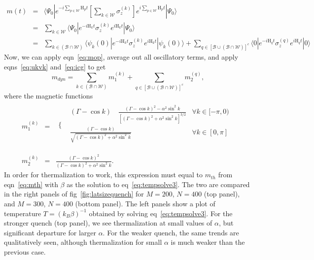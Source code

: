 \documentclass[a4paper,10pt]{article}
\begin{document}
\begin{eqnarray}
{m}(t)   &=&  \langle\Psi_0|e^{-i\sum_{p\in\mathcal{W}}\mathrm{H}_p t}\left[\sum_{k\in\mathcal{W}}\sigma^{(k)}_z\right]e^{i\sum_{p\in\mathcal{W}}\mathrm{H}_p t}|\Psi_0\rangle  \nonumber \\
              &=&  \sum_{k\in\mathcal{W}} \langle\Psi_0|e^{-i\mathrm{H}_k t}\sigma^{(k)}_z e^{i\mathrm{H}_k t}|\Psi_0\rangle \nonumber \\
              &=& \sum_{k\in{\left(\mathcal{B}\cap\mathcal{W}\right)}} \langle\psi_k(0)|e^{-i\mathrm{H}_k t}\sigma^{(k)}_z e^{i\mathrm{H}_k t}|\psi_k(0)\rangle + \sum_{q\in\left[\mathcal{B}\cup\left(\mathcal{B}\cap\mathcal{W}\right)\right]^c } \langle0|e^{-i\mathrm{H}_q t}\sigma^{(q)}_z e^{i\mathrm{H}_q t}|0\rangle
\end{eqnarray}
Now, we can apply eqn~\ref{eq:mop}, average out all oscillatory terms, and apply eqns~\ref{eq:ukvk} and~\ref{eq:icg} to get 
\begin{equation}
\label{eq:mdyn3}
 m_{dyn}= \sum_{k\in{\left(\mathcal{B}\cap\mathcal{W}\right)}} m^{(k)}_{1}  + \sum_{q\in\left[\mathcal{B}\cup\left(\mathcal{B}\cap\mathcal{W}\right)\right]^c } m^{(q)}_{2},
\end{equation}
where the magnetic functions
\begin{eqnarray}
m^{(k)}_{1} &=& \begin{array}{ll}
 \bigg\{ & 
\begin{array}{ll}
 \left(\Gamma-\cos{k}\right) \quad \frac{\left(\Gamma-\cos{k}\right)^2-\alpha^2  \sin^2{k}}{\left[\left(\Gamma-\cos{k}\right)^2+\alpha^2  \sin^2{k}\right]^{3/2}} &\forall k \in [-\pi,0) \\
 \frac{\left(\Gamma-\cos{k}\right)}{\sqrt{\left(\Gamma-\cos{k}\right)^2+\alpha^2  \sin^2{k}}} & \forall k \in [0,\pi]  \\
\end{array}
 \\
\end{array} \nonumber \\
m^{(k)}_{2} &=& \frac{\left(\Gamma-\cos{k}\right)^2}{\left(\Gamma-\cos{k}\right)^2+\alpha^2  \sin^2{k}}.
\end{eqnarray}
In order for thermalization to work, this expression must equal to $m_{th}$ from eqn~\ref{eq:mth} with $\beta$ as the solution to eq~\ref{eq:tempsolve3}. The two are compared in the right panels of fig~\ref{fig:latsizequench} for $M=200$, $N=400$ (top panel), and $M=300$, $N=400$ (bottom panel). The left panels show a plot of temperature $T=(k_B\beta)^{-1}$ obtained by solving eq~\ref{eq:tempsolve3}. For the stronger quench (top panel), we see thermalization at small values of $\alpha$, but significant departure for larger $\alpha$. For the weaker quench, the same trends are qualitatively seen, although thermalization for small $\alpha$ is much weaker than the previous case.
\end{document}
